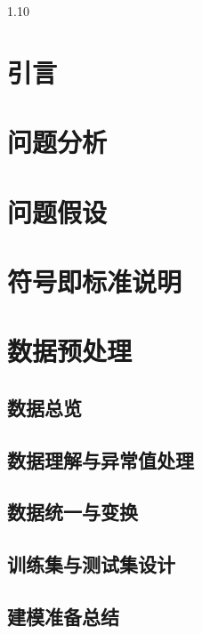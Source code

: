 \documentclass[12pt,a4paper]{ctexrep}
\numberwithin{equation}{section}
\newcommand{\song}{\songti}
\begin{document}
	
	\begin{spacing}{1.10}
		{\song{}
			\section{引言}
			
			
			\section{问题分析}
			
			\section{问题假设}
			
			\section{符号即标准说明}
			
			\section{数据预处理}
			\subsection{数据总览}
			\subsection{数据理解与异常值处理}
			\subsection{数据统一与变换}
			\subsection{训练集与测试集设计}
			\subsection{建模准备总结}
		
}
\end{spacing}
\end{document}
